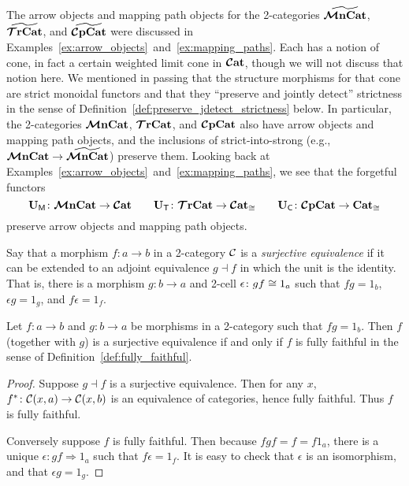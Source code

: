 \documentclass[11pt,oneside,article]{memoir}
\begin{document}
\begin{remark}
      \label{rem:pres_joint_detect}
   The arrow objects and mapping path objects for the 2-categories $\widetilde{\bm{\mathcal{M}}\mathbf{nCat}}$,
   $\widetilde{\bm{\mathcal{T}}\mathbf{rCat}}$, and $\widetilde{\bm{\mathcal{C}}\mathbf{pCat}}$ were discussed in
   Examples~\ref{ex:arrow_objects}~and~\ref{ex:mapping_paths}. Each has a notion of cone, in fact a
   certain weighted limit cone in $\bm{\mathcal{C}}\mathbf{at}$, though we will not discuss that notion here. We mentioned
   in passing that the structure morphisms for that cone are strict monoidal functors and that they
   ``preserve and jointly detect'' strictness in the sense of
   Definition~\ref{def:preserve_jdetect_strictness} below. In particular, the 2-categories
   $\bm{\mathcal{M}}\mathbf{nCat}$, $\bm{\mathcal{T}}\mathbf{rCat}$, and $\bm{\mathcal{C}}\mathbf{pCat}$ also have arrow objects and mapping path objects, and the
   inclusions of strict-into-strong (e.g., $\bm{\mathcal{M}}\mathbf{nCat}\to\widetilde{\bm{\mathcal{M}}\mathbf{nCat}}$) preserve them. Looking back
   at Examples~\ref{ex:arrow_objects}~and~\ref{ex:mapping_paths}, we see that the forgetful functors
   \[
      \mathbf{U}_{\mathsf{M}}\colon\bm{\mathcal{M}}\mathbf{nCat}\to\bm{\mathcal{C}}\mathbf{at}
         \qquad
      \mathbf{U}_{\mathsf{T}}\colon\bm{\mathcal{T}}\mathbf{rCat}\to\bm{\mathcal{C}}\mathbf{at}_{\cong}
         \qquad
      \mathbf{U}_{\mathsf{C}}\colon\bm{\mathcal{C}}\mathbf{pCat}\to\mathbf{Cat}_{\cong}
   \]
   preserve arrow objects and mapping path objects.
\end{remark}

\begin{definition}
      \label{def:surjective_equivalence}
   Say that a morphism $f\colon a\to b$ in a 2-category $\mathcal{C}$ is a \emph{surjective
   equivalence} if it can be extended to an adjoint equivalence $g\dashv f$ in which the unit is the
   identity. That is, there is a morphism $g\colon b\to a$ and 2-cell $\epsilon\colon gf\cong 1_a$
   such that $fg=1_b$, $\epsilon g=1_g$, and $f\epsilon=1_f$.
\end{definition}

\begin{lemma}
      \label{lem:fully_faithful_surjective_equiv}
   Let $f\colon a\to b$ and $g\colon b\to a$ be morphisms in a 2-category such that $fg=1_b$. Then
   $f$ (together with $g$) is a surjective equivalence if and only if $f$ is fully faithful in the
   sense of Definition~\ref{def:fully_faithful}.
\end{lemma}
\begin{proof}
   Suppose $g\dashv f$ is a surjective equivalence. Then for any $x$,
   $f^*\colon\mathcal{C}(x,a)\to\mathcal{C}(x,b)$ is an equivalence of categories, hence fully faithful.
   Thus $f$ is fully faithful.

   Conversely suppose $f$ is fully faithful. Then because $fgf=f=f 1_a$, there is a unique
   $\epsilon\colon gf\Rightarrow 1_a$ such that $f\epsilon=1_f$. It is easy to check that $\epsilon$
   is an isomorphism, and that $\epsilon g=1_g$.
\end{proof}
\end{document}
